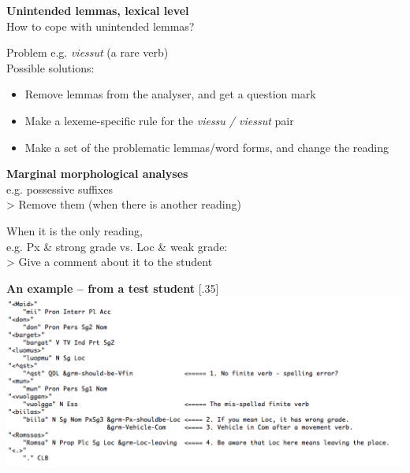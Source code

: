 \documentclass[landscape,norsk,11pt]{seminar}
\begin{document}
\begin{slide}
\newslide
\textbf{Unintended lemmas, lexical level} \\
How to cope with unintended lemmas?

Problem e.g. \textit{viessut} (a rare verb) \\
Possible solutions:

\begin{itemize}
\item{Remove lemmas from the analyser, and get a question mark}
\item{Make a lexeme-specific rule for the \textit{viessu / viessut} pair}
\item{Make a set of the problematic lemmas/word forms, and change the reading}
\end{itemize}


\newslide
\textbf{Marginal morphological analyses} \\
e.g. possessive suffixes \\
> Remove them (when there is another reading)

When it is the only reading, \\ e.g. Px \& strong grade vs. Loc \& weak grade: \\
> Give a comment about it to the student







\newslide
\textbf{An example -- from a test student}
\scalebox{.32}[.35]{\includegraphics{img/sentence_example.png}}


\end{slide}
\end{document}
